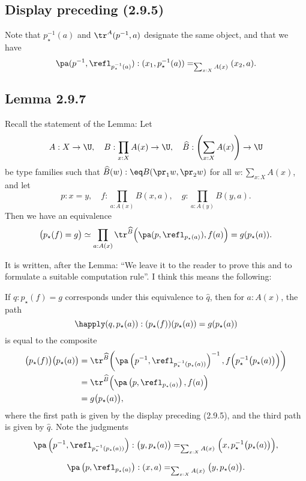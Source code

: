 \documentclass[12pt]{article}
\begin{document}

\subsection{Display preceding (2.9.5)}

Note that $p^{-1}_\star(a)$ and $\tr^A(p^{-1},a)$ designate the same object, and that we have 
$$
\pa(p^{-1},\refl_{p^{-1}_\star(a)}):(x_1,p^{-1}_\star(a))=_{\sum_{x:X}A(x)}(x_2,a).
$$ 


\subsection{Lemma 2.9.7}

Recall the statement of the Lemma: Let 
$$
A:X\to\U,\quad B:\prod_{x:X}A(x)\to\U,\quad\widehat B:\left(\sum_{x:X}A(x)\right)\to\U
$$ 
be type families such that $\widehat B(w):\eq B(\pr_1w,\pr_2w)$ for all $w:\sum_{x:X}A(x)$, and let 
$$
p:x=y,\quad f:\prod_{a:A(x)}B(x,a),\quad g:\prod_{a:A(y)}B(y,a).
$$ 
Then we have an equivalence 
$$
\big(p_\star(f)=g\big)\simeq\prod_{a:A(x)}\tr^{\widehat B}\Big(\pa(p,\refl_{p_\star(a)}),f(a)\Big)=g(p_\star(a)).
$$ 

It is written, after the Lemma: ``We leave it to the reader to prove this and to formulate a suitable computation rule''. I think this means the following:

If $q:p_\star(f)=g$ corresponds under this equivalence to $\widehat q$, then for $a:A(x)$, the path 
$$
\happly(q,p_\star(a)):(p_\star(f))(p_\star(a))=g(p_\star(a))
$$ 
is equal to the composite 
\begin{align*}
\big(p_\star(f)\big)\big(p_\star(a)\big)&=\tr^{\widehat B}\bigg(\pa\left(p^{-1},\refl_{p^{-1}_\star(p_\star(a))}\right)^{-1},f\Big(p^{-1}_\star\big(p_\star(a)\big)\Big)\bigg)\\ 
&=\tr^{\widehat B}\Big(\pa\left(p,\refl_{p_\star(a)}\right),f(a)\Big)\\
&=g\big(p_\star(a)\big),
\end{align*}
where the first path is given by the display preceding (2.9.5), and the third path is given by $\widehat q$. Note the judgments
$$
\pa\left(p^{-1},\refl_{p^{-1}_\star(p_\star(a))}\right):\big(y,p_\star(a)\big)=_{\sum_{x:X}A(x)}\Big(x,p^{-1}_\star\big(p_\star(a)\big)\Big),
$$ 

$$
\pa\left(p,\refl_{p_\star(a)}\right):(x,a)=_{\sum_{x:X}A(x)}\big(y,p_\star(a)\big).
$$ 

\end{document}
